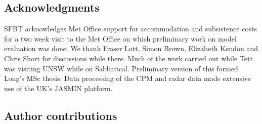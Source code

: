 \documentclass[11pt,a4paper]{article}
\begin{document}

\printbibliography %

\subsection*{Acknowledgments}
SFBT acknowledges  Met Office support for accommodation and subsistence costs for a two week visit to the Met Office on which preliminary work on model evaluation was done. We thank Fraser Lott, Simon Brown, Elizabeth Kendon and Chris Short for discussions while there. Much of the  work carried out while Tett was visiting UNSW while on Sabbatical. Preliminary version of this formed Long's MSc thesis. Data processing of the CPM and radar data made extensive use of the UK's JASMIN platform. 

\subsection*{Author contributions}

\clearpage




\clearpage



\clearpage
\end{document}
